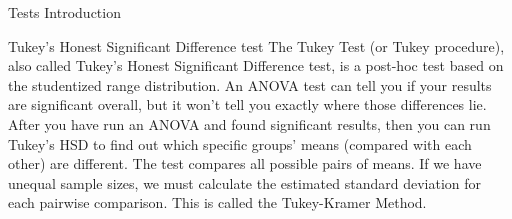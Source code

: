 \documentclass[
  ignorenonframetext,
]{beamer}
\begin{document}
\begin{frame}{Tests Introduction}
\begin{block}{Tukey's Honest Significant Difference test}
\protect\hypertarget{tukeys-honest-significant-difference-test}{}
The Tukey Test (or Tukey procedure), also called Tukey's Honest
Significant Difference test, is a post-hoc test based on the studentized
range distribution. An ANOVA test can tell you if your results are
significant overall, but it won't tell you exactly where those
differences lie. After you have run an ANOVA and found significant
results, then you can run Tukey's HSD to find out which specific groups'
means (compared with each other) are different. The test compares all
possible pairs of means. If we have unequal sample sizes, we must
calculate the estimated standard deviation for each pairwise comparison.
This is called the Tukey-Kramer Method.
\end{block}
\end{frame}
\end{document}
